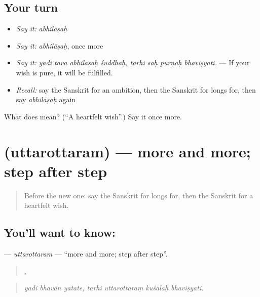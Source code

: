\subsection*{Your turn}
\begin{itemize}
\raggedright
  \item \emph{Say it:} \emph{abhilāṣaḥ}
  \item \emph{Say it:} \emph{abhilāṣaḥ}, once more
  \item \emph{Say it:} \emph{yadi tava abhilāṣaḥ śuddhaḥ, tarhi saḥ pūrṇaḥ bhaviṣyati.} — If your wish is pure, it will be fulfilled.
  \item \emph{Recall:} say the Sanskrit for an ambition, then the Sanskrit for longs for, then say \emph{abhilāṣaḥ} again
\end{itemize}

\begin{tcolorbox}[breakable,colback=teal!4,colframe=teal!35!black,title={Before you move on}]
What does  mean? (\textquotedblleft{}A heartfelt wish\textquotedblright{}.) Say it once more.
\end{tcolorbox}
\section[\texorpdfstring{\sk{उत्तरोत्तरम्} (uttarottaram)}{उत्तरोत्तरम् (uttarottaram)}]{ (uttarottaram) — more and more; step after step}

\label{lesson:SA-C383-uttarottaram}



\begin{quote}
Before the new one: say the Sanskrit for longs for, then the Sanskrit for a heartfelt wish.
\end{quote}

\subsection*{You'll want to know: }
\textbf{} — \emph{uttarottaram} — \textquotedblleft{}more and more; step after step\textquotedblright{}.

\begin{quote}
  ,    
\end{quote}

\begin{quote}
\emph{yadi bhavān yatate, tarhi uttarottaraṃ kuśalaḥ bhaviṣyati.}
\end{quote}

